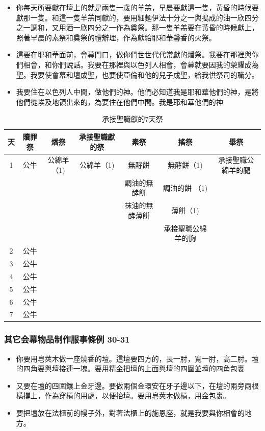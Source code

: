 \begin{table}
\begin{itemize} 
\itemsep-.35em
\item 你每天所要獻在壇上的就是兩隻一歲的羊羔，早晨要獻這一隻，黃昏的時候要獻那一隻。和這一隻羊羔同獻的，要用細麵伊法十分之一與搗成的油一欣四分之一調和，又用酒一欣四分之一作為奠祭。那一隻羊羔要在黃昏的時候獻上，照著早晨的素祭和奠祭的禮辦理，作為獻給耶和華馨香的火祭。
\item 這要在耶和華面前，會幕門口，做你們世世代代常獻的燔祭。我要在那裡與你們相會，和你們說話。我要在那裡與以色列人相會，會幕就要因我的榮耀成為聖。我要使會幕和壇成聖，也要使亞倫和他的兒子成聖，給我供祭司的職分。
\item 我要住在以色列人中間，做他們的神。他們必知道我是耶和華他們的神，是將他們從埃及地領出來的，為要住在他們中間。我是耶和華他們的神
\end{itemize}
\begin{table}[H]
\centering
\begin{tabular}{|c|c|c|c|c|c|c| }
\hline
\hline
天&贖罪祭 & 燔祭&承接聖職獻的祭 &素祭 &搖祭 & 舉祭\\\hline
1&公牛& 公綿羊（1) &公綿羊（1) & 無酵餅 &無酵餅（1) & 承接聖職公綿羊的腿\\\hline
 &&   & & 調油的無酵餅  & 調油的餅 （1) & \\\hline
 & &   & & 抹油的無酵薄餅 & 薄餅（1) &\\\hline
& &   & &   & 承接聖職公綿羊的胸 & \\\hline
2& 公牛&   & &   &   & \\\hline
3&公牛 &   & &   &   & \\\hline
4&公牛 &   & &   &   & \\\hline
5&公牛 &   & &   &   & \\\hline
6&公牛 &   & &   &   & \\\hline
7&公牛 &   & &   &  & \\\hline
\end{tabular}
\caption{承接聖職獻的7天祭}
\end{table}


\subsubsection{其它会幕物品制作服事條例 30-31}
\begin{itemize} 
\itemsep-.35em
\item 你要用皂莢木做一座燒香的壇。這壇要四方的，長一肘，寬一肘，高二肘。壇的四角要與壇接連一塊。要用精金把壇的上面與壇的四圍並壇的四角包裹
\item 又要在壇的四圍鑲上金牙邊。要做兩個金環安在牙子邊以下，在壇的兩旁兩根橫撐上，作為穿槓的用處，以便抬壇。要用皂莢木做槓，用金包裹。
\item 要把壇放在法櫃前的幔子外，對著法櫃上的施恩座，就是我要與你相會的地方。 
\end{itemize}


\end{table}
